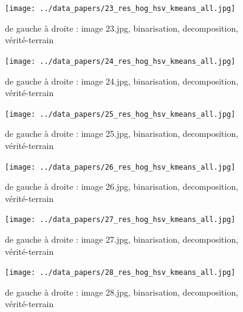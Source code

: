 \documentclass{book}
\begin{document}
\begin{figure}[H]
\begin{center}
\texttt{[image: ../data\_papers/23\_res\_hog\_hsv\_kmeans\_all.jpg]}
\end{center}
\caption{de gauche à droite : image 23.jpg, binarisation, decomposition, vérité-terrain}
\label{23}
\end{figure}
\clearpage


\begin{figure}[H]
\begin{center}
\texttt{[image: ../data\_papers/24\_res\_hog\_hsv\_kmeans\_all.jpg]}
\end{center}
\caption{de gauche à droite : image 24.jpg, binarisation, decomposition, vérité-terrain}
\label{24}
\end{figure}
\clearpage


\begin{figure}[H]
\begin{center}
\texttt{[image: ../data\_papers/25\_res\_hog\_hsv\_kmeans\_all.jpg]}
\end{center}
\caption{de gauche à droite : image 25.jpg, binarisation, decomposition, vérité-terrain}
\label{25}
\end{figure}
\clearpage


\begin{figure}[H]
\begin{center}
\texttt{[image: ../data\_papers/26\_res\_hog\_hsv\_kmeans\_all.jpg]}
\end{center}
\caption{de gauche à droite : image 26.jpg, binarisation, decomposition, vérité-terrain}
\label{26}
\end{figure}
\clearpage


\begin{figure}[H]
\begin{center}
\texttt{[image: ../data\_papers/27\_res\_hog\_hsv\_kmeans\_all.jpg]}
\end{center}
\caption{de gauche à droite : image 27.jpg, binarisation, decomposition, vérité-terrain}
\label{27}
\end{figure}
\clearpage


\begin{figure}[H]
\begin{center}
\texttt{[image: ../data\_papers/28\_res\_hog\_hsv\_kmeans\_all.jpg]}
\end{center}
\caption{de gauche à droite : image 28.jpg, binarisation, decomposition, vérité-terrain}
\label{28}
\end{figure}
\clearpage
\end{document}
